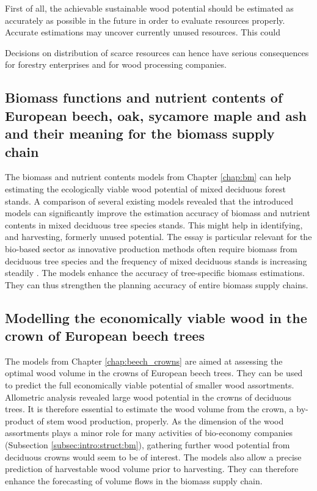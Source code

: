First of all, the achievable sustainable wood potential should be estimated as accurately as possible in the future in order to evaluate resources properly. Accurate estimations may uncover currently unused resources. This could



Decisions on distribution of scarce resources can hence have serious consequences for forestry enterprises and for wood processing companies.

\subsection{Biomass functions and nutrient contents of European beech, oak, sycamore maple and ash and their meaning for the biomass supply chain}
\label{subsec:discussion:struct:bm}
The biomass and nutrient contents models from Chapter \ref{chap:bm} can help estimating the ecologically viable wood potential of mixed deciduous forest stands. A comparison of several existing models revealed that the introduced models can significantly improve the estimation accuracy of biomass and nutrient contents in mixed deciduous tree species stands. This might help in identifying, and harvesting, formerly unused potential. The essay is particular relevant for the bio-based sector as innovative production methods often require biomass from deciduous tree species \citep[p. 1]{auer_2016} and the frequency of mixed deciduous stands is increasing steadily \citep{ti_2014}. The models enhance the accuracy of tree-specific biomass estimations. They can thus strengthen the planning accuracy of entire biomass supply chains.

\subsection{Modelling the economically viable wood in the crown of European beech trees}
\label{subsec:discussion:struct:beech_crowns}
The models from Chapter \ref{chap:beech_crowns} are aimed at assessing the optimal wood volume in the crowns of European beech trees. They can be used to predict the full economically viable potential of smaller wood assortments. Allometric analysis revealed large wood potential in the crowns of deciduous trees. It is therefore essential to estimate the wood volume from the crown, a by-product of stem wood production, properly. As the dimension of the wood assortments plays a minor role for many activities of bio-economy companies (Subsection \ref{subsec:intro:struct:bm}), gathering further wood potential from deciduous crowns would seem to be of interest. The models also allow a precise prediction of harvestable wood volume prior to harvesting. They can therefore enhance the forecasting of volume flows in the biomass supply chain.


